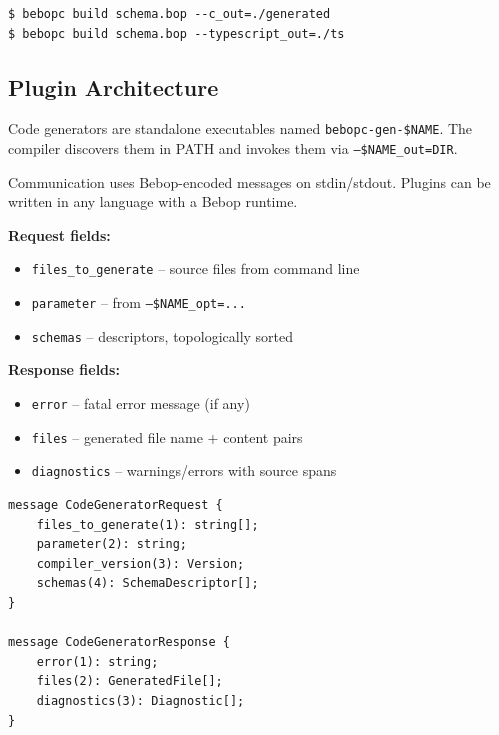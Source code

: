 \documentclass[11pt,onecolumn]{article}
\begin{document}
\begin{lstlisting}[language={}]
$ bebopc build schema.bop --c_out=./generated
$ bebopc build schema.bop --typescript_out=./ts
\end{lstlisting}

\subsection{Plugin Architecture}

Code generators are standalone executables named \texttt{bebopc-gen-\$NAME}. The compiler discovers them in PATH and invokes them via \texttt{--\$NAME\_out=DIR}.

\begin{minipage}{\textwidth}
\begin{minipage}[t]{0.48\textwidth}
\raggedright
Communication uses Bebop-encoded messages on stdin/stdout. Plugins can be written in any language with a Bebop runtime.

\textbf{Request fields:}
\begin{itemize}[leftmargin=1.2em,itemsep=1pt,topsep=2pt]
\item \texttt{files\_to\_generate} -- source files from command line
\item \texttt{parameter} -- from \texttt{--\$NAME\_opt=...}
\item \texttt{schemas} -- descriptors, topologically sorted
\end{itemize}

\textbf{Response fields:}
\begin{itemize}[leftmargin=1.2em,itemsep=1pt,topsep=2pt]
\item \texttt{error} -- fatal error message (if any)
\item \texttt{files} -- generated file name + content pairs
\item \texttt{diagnostics} -- warnings/errors with source spans
\end{itemize}
\end{minipage}\hfill
\begin{minipage}[t]{0.48\textwidth}
\begin{lstlisting}[language=bebop,aboveskip=0pt,belowskip=0pt]
message CodeGeneratorRequest {
    files_to_generate(1): string[];
    parameter(2): string;
    compiler_version(3): Version;
    schemas(4): SchemaDescriptor[];
}

message CodeGeneratorResponse {
    error(1): string;
    files(2): GeneratedFile[];
    diagnostics(3): Diagnostic[];
}
\end{lstlisting}
\end{minipage}
\end{minipage}
\end{document}
